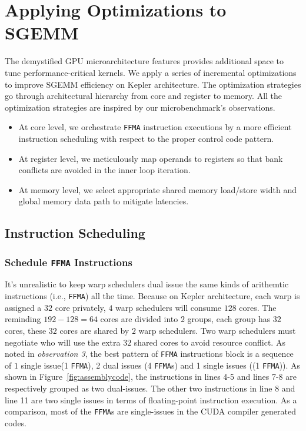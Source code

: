 \section{Applying Optimizations to SGEMM}
\label{sec:optimization}
The demystified GPU microarchitecture features provides additional space to tune performance-critical kernels. We apply a series of incremental optimizations to improve SGEMM efficiency on Kepler architecture. The optimization strategies go through architectural hierarchy from core and register to memory. All the optimization strategies are inspired by our microbenchmark's observations.
\begin{itemize}
\item At core level, we orchestrate {\tt FFMA} instruction executions by a more efficient instruction scheduling with respect to the proper control code pattern.
\item At register level, we meticulously map operands to registers so that bank conflicts are avoided in the inner loop iteration.
\item At memory level, we select appropriate shared memory load/store width and global memory data path to mitigate latencies.
\end{itemize}

\subsection{Instruction Scheduling}
\subsubsection{Schedule {\tt FFMA} Instructions}
It's unrealistic to keep warp schedulers dual issue the same kinds of arithemtic instructions (i.e., {\tt FFMA}) all the time. Because on Kepler architecture, each warp is assigned a $32$ core privately, $4$ warp schedulers will consume $128$ cores. The reminding $192-128=64$ cores are divided into $2$ groups, each group has $32$ cores, these $32$ cores are shared by $2$ warp schedulers. Two warp schedulers must negotiate who will use the extra $32$ shared cores to avoid resource conflict.
As noted in {\em observation 3}, the best pattern of {\tt FFMA} instructions block is a sequence of $1$ single issue(1 {\tt FFMA}), 2 dual issues (4 {\tt FFMA}s) and 1 single issues ((1 {\tt FFMA})). As shown in Figure~\ref{fig:assemblycode}, the instructions in lines 4-5 and lines 7-8 are respectively grouped as two dual-issues. The other two instructions in line 8 and line 11 are two single issues in terms of floating-point instruction execution. As a comparison, most of the {\tt FFMA}s are single-issues in the CUDA compiler generated codes.

